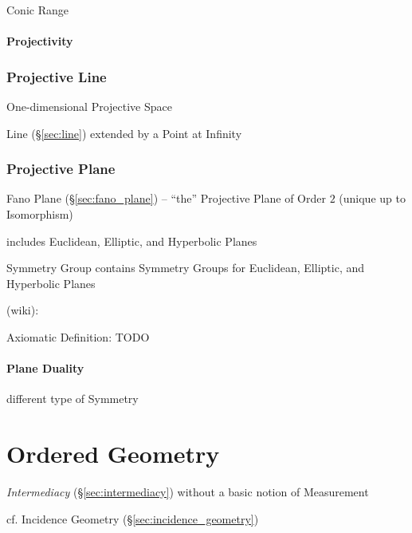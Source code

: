 Conic Range



\paragraph{Projectivity}\label{sec:projectivity}\hfill



\subsubsection{Projective Line}\label{sec:projective_line}

One-dimensional Projective Space

Line (\S\ref{sec:line}) extended by a Point at Infinity



\subsubsection{Projective Plane}\label{sec:projective_plane}

Fano Plane (\S\ref{sec:fano_plane}) -- ``the'' Projective Plane of Order $2$
(unique up to Isomorphism)

includes Euclidean, Elliptic, and Hyperbolic Planes

Symmetry Group contains Symmetry Groups for Euclidean, Elliptic, and
Hyperbolic Planes

(wiki):

Axiomatic Definition: TODO



\paragraph{Plane Duality}\label{sec:plane_duality}\hfill

different type of Symmetry %



\section{Ordered Geometry}\label{sec:ordered_geometry}

\emph{Intermediacy} (\S\ref{sec:intermediacy}) without a basic notion of
Measurement

\fist cf. Incidence Geometry (\S\ref{sec:incidence_geometry})

